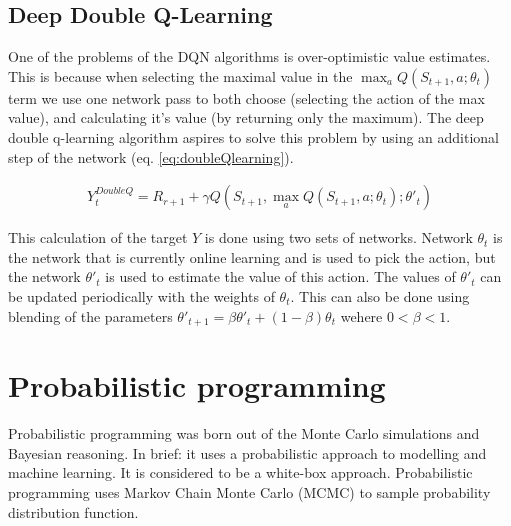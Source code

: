 \subsection{Deep Double Q-Learning}

One of the problems of the DQN algorithms is over-optimistic value estimates.
This is because when selecting the maximal value in the $\max_{a} Q(S_{t+1},a; \theta_{t})$ term we use one network pass to both choose (selecting the action of the max value), and calculating it's value (by returning only the maximum).
The deep double q-learning algorithm \cite{https://doi.org/10.48550/arxiv.1509.06461} aspires to solve this problem by using an additional step of the network (eq. \ref{eq:doubleQlearning}).

\begin{align}
 Y_{t}^{DoubleQ} =  R_{r+1} + \gamma Q(S_{t+1}, \max_{a} Q(S_{t+1},a; \theta_{t}); \theta'_{t})
\label{eq:doubleQlearning}
\end{align}

This calculation of the target $Y$ is done using two sets of networks. Network $\theta_{t}$ is the network that is currently online learning and is used to pick the action, but the network $\theta'_{t}$ is used to estimate the value of this action.
The values of $\theta'_{t}$ can be updated periodically with the weights of $\theta_{t}$.
This can also be done using blending of the parameters $\theta'_{t+1} = \beta \theta'_{t} + (1-\beta)\theta_{t}$ wehere $0<\beta<1$.

\section{Probabilistic programming}
%
%

Probabilistic programming \cite{davidsonpilon2015probabilistic} was born out of the Monte Carlo simulations and Bayesian reasoning. In brief: it uses a probabilistic approach to modelling and machine learning.
It is considered to be a white-box approach.
Probabilistic programming uses Markov Chain Monte Carlo (MCMC) to sample probability distribution function.



